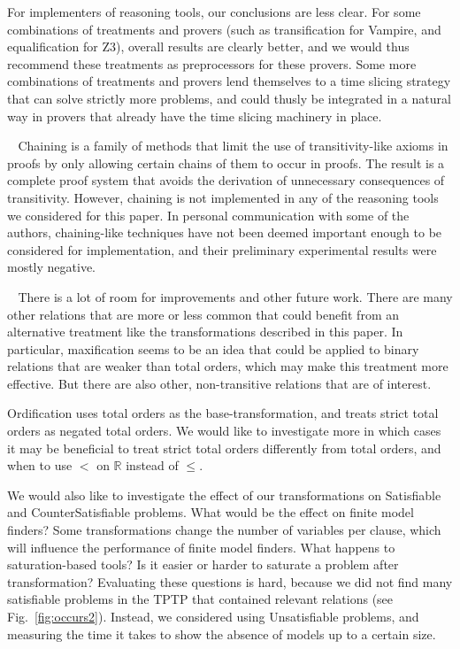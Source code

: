 \documentclass{article}
\renewcommand{\leq}{\leqslant}
\renewcommand{\paragraph}[1]{\vspace{0.2cm}\noindent {\bf #1} $\;\;$}
\begin{document}
For implementers of reasoning tools, our conclusions are less clear. For some combinations of treatments and provers (such as transification for Vampire, and equalification for Z3), overall results are clearly better, and we would thus recommend these treatments as preprocessors for these provers. Some more combinations of treatments and provers lend themselves to a time slicing strategy that can solve strictly more problems, and could thusly be integrated in a natural way in provers that already have the time slicing machinery in place.

\paragraph{Related Work} Chaining \cite{chaining} is a family of methods that limit the use of transitivity-like axioms in proofs by only allowing certain chains of them to occur in proofs. The result is a complete proof system that avoids the derivation of unnecessary consequences of transitivity. However, chaining is not implemented in any of the reasoning tools we considered for this paper. In personal communication with some of the authors, chaining-like techniques have not been deemed important enough to be considered for implementation, and their preliminary experimental results were mostly negative.

\paragraph{Future Work} There is a lot of room for improvements and other future work. There are many other relations that are more or less common that could benefit from an alternative treatment like the transformations described in this paper. In particular, maxification seems to be an idea that could be applied to binary relations that are weaker than total orders, which may make this treatment more effective. But there are also other, non-transitive relations that are of interest.

Ordification uses total orders as the base-transformation, and treats strict total orders as negated total orders. We would like to investigate more in which cases it may be beneficial to treat strict total orders differently from total orders, and when to use $<$ on \ensuremath{\mathbb{R}} instead of \ensuremath{\leq }.

We would also like to investigate the effect of our transformations on Satisfiable and CounterSatisfiable problems. What would be the effect on finite model finders? Some transformations change the number of variables per clause, which will influence the performance of finite model finders. What happens to saturation-based tools? Is it easier or harder to saturate a problem after transformation? Evaluating these questions is hard, because we did not find many satisfiable problems in the TPTP that contained relevant relations (see Fig.\ \ref{fig:occurs2}). Instead, we considered using Unsatisfiable problems, and measuring the time it takes to show the absence of models up to a certain size.
\end{document}
